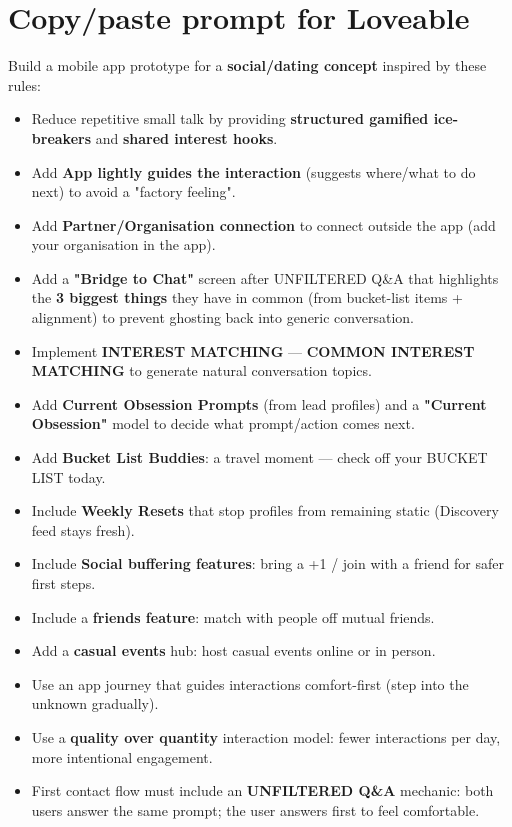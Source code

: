 \documentclass[10pt,a4paper]{article}
\begin{document}
\section*{\color{eublue}Copy/paste prompt for Loveable}

Build a mobile app prototype for a \textbf{social/dating concept} inspired by these rules:
\begin{itemize}
\item Reduce repetitive small talk by providing \textbf{structured gamified ice-breakers} and \textbf{shared interest hooks}.
\item Add \textbf{App lightly guides the interaction} (suggests where/what to do next) to avoid a "factory feeling".
\item Add \textbf{Partner/Organisation connection} to connect outside the app (add your organisation in the app).
\item Add a \textbf{"Bridge to Chat"} screen after UNFILTERED Q\&A that highlights the \textbf{3 biggest things} they have in common (from bucket-list items + alignment) to prevent ghosting back into generic conversation.
\item Implement \textbf{INTEREST MATCHING} --- \textbf{COMMON INTEREST MATCHING} to generate natural conversation topics.
\item Add \textbf{Current Obsession Prompts} (from lead profiles) and a \textbf{"Current Obsession"} model to decide what prompt/action comes next.
\item Add \textbf{Bucket List Buddies}: a travel moment --- check off your BUCKET LIST today.
\item Include \textbf{Weekly Resets} that stop profiles from remaining static (Discovery feed stays fresh).
\item Include \textbf{Social buffering features}: bring a +1 / join with a friend for safer first steps.
\item Include a \textbf{friends feature}: match with people off mutual friends.
\item Add a \textbf{casual events} hub: host casual events online or in person.
\item Use an app journey that guides interactions comfort-first (step into the unknown gradually).
\item Use a \textbf{quality over quantity} interaction model: fewer interactions per day, more intentional engagement.
\item First contact flow must include an \textbf{UNFILTERED Q\&A} mechanic: both users answer the same prompt; the user answers first to feel comfortable.

\end{itemize}
\end{document}
